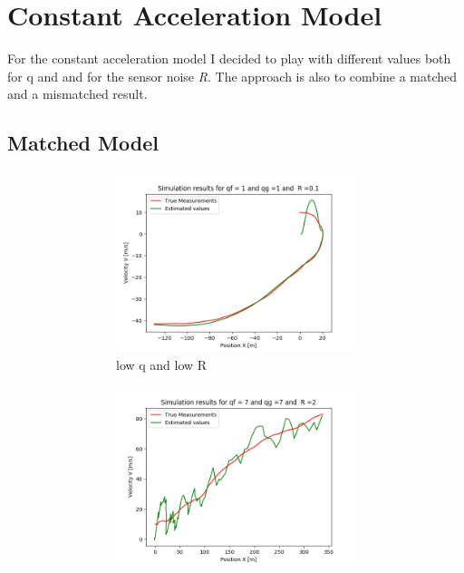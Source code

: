 \documentclass{article}
\begin{document}
        \section{Constant Acceleration Model}

        For the constant acceleration model I decided to play with different values both for q and and for the sensor noise \textit{R}. The 
        approach is also to combine a matched and a mismatched result. 

        \subsection{Matched Model}

        \begin{figure}[H]
            \centering 
            \begin{subfigure}{1\textwidth}  
                \begin{subfigure}{.5\textwidth}  
                    \includegraphics[width=1\linewidth]{./img/acc/qf1_qg1_r01.png}
                    \caption{low q and low R}
                \end{subfigure}
                \begin{subfigure}{.5\textwidth}  
                    \includegraphics[width=1\linewidth]{./img/acc/qf7_qg7_r2.png}

\end{subfigure}
\end{subfigure}
\end{figure}
\end{document}
